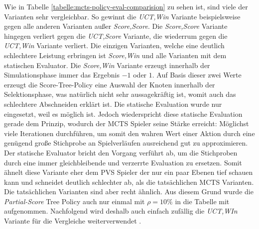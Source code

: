 Wie in Tabelle \ref{tabelle:mcts-policy-eval-comparision} zu sehen ist, sind viele der Varianten sehr vergleichbar. So gewinnt die \emph{\acs{UCT},Win} Variante beispielsweise gegen alle anderen Varianten außer \emph{Score,Score}. Die \emph{Score,Score} Variante hingegen verliert gegen die \emph{\acs{UCT},Score} Variante, die wiederrum gegen die \emph{\acs{UCT},Win} Variante verliert. Die einzigen Varianten, welche eine deutlich schlechtere Leistung erbringen ist \emph{Score,Win} und alle Varianten mit dem statischen Evaluator. Die \emph{Score,Win} Variante erzeugt innerhalb der Simulationsphase immer das Ergebnis $-1$ oder $1$. Auf Basis dieser zwei Werte erzeugt die Score-Tree-Policy eine Auswahl der Knoten innerhalb der Selektionsphase, was natürlich nicht sehr aussagekräftig ist, womit auch das schlechtere Abschneiden erklärt ist. Die statische Evaluation wurde nur eingesetzt, weil es möglich ist. Jedoch wiederspricht diese statische Evaluation gerade dem Prinzip, wodurch der \ac{MCTS} Spieler seine Stärke erreicht: Möglichst viele Iterationen durchführen, um somit den wahren Wert einer Aktion durch eine genügend große Stichprobe an Spielverläufen ausreichend gut zu approximieren. Der statische Evaluator bricht den Vorgang verführt ab, um die Stichproben durch eine immer gleichbleibende und verzerrte Evaluation zu ersetzen. Somit ähnelt diese Variante eher dem \ac{PVS} Spieler der nur ein paar Ebenen tief schauen kann und schneidet deutlich schlechter ab, als die tatsächlichen \ac{MCTS} Varianten. Die tatsächlichen Varianten sind aber recht ähnlich. Aus diesem Grund wurde die \emph{Partial-Score} Tree Policy auch nur einmal mit $\rho = 10\%$ in die Tabelle mit aufgenommen. Nachfolgend wird deshalb auch einfach zufällig die \emph{\acs{UCT},WIn} Variante für die Vergleiche weiterverwendet .

